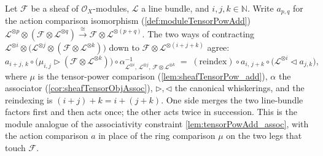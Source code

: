 \begin{lemma}\leanok
  \label{lem:moduleTensorPowAdd_assoc}
  Let \(\mathcal{F}\) be a sheaf of \(\mathcal{O}_X\)-modules, \(\mathcal{L}\) a line
  bundle, and \(i, j, k \in \mathbb{N}\). Write \(a_{p,q}\) for the action comparison
  isomorphism (\cref{def:moduleTensorPowAdd})
  \(\mathcal{L}^{\otimes p}\otimes(\mathcal{F}\otimes\mathcal{L}^{\otimes q})
  \xrightarrow{\cong}\mathcal{F}\otimes\mathcal{L}^{\otimes(p+q)}\). The two ways of
  contracting
  \(\mathcal{L}^{\otimes i}\otimes\bigl(\mathcal{L}^{\otimes j}\otimes
  (\mathcal{F}\otimes\mathcal{L}^{\otimes k})\bigr)\) down to
  \(\mathcal{F}\otimes\mathcal{L}^{\otimes(i+j+k)}\) agree:
  \[
    a_{i+j,\,k}\circ\bigl(\mu_{i,j}\rhd(\mathcal{F}\otimes\mathcal{L}^{\otimes k})\bigr)
      \circ \alpha^{-1}_{\mathcal{L}^{\otimes i},\,\mathcal{L}^{\otimes j},\,
        \mathcal{F}\otimes\mathcal{L}^{\otimes k}}
    \;=\;
    \mathrm{(reindex)}\circ a_{i,\,j+k}\circ
      \bigl(\mathcal{L}^{\otimes i}\lhd a_{j,k}\bigr),
  \]
  where \(\mu\) is the tensor-power comparison (\cref{lem:sheafTensorPow_add}),
  \(\alpha\) the associator (\cref{cor:sheafTensorObjAssoc}), \(\rhd, \lhd\) the
  canonical whiskerings, and the reindexing is \((i+j)+k = i+(j+k)\). One side merges
  the two line-bundle factors first and then acts once; the other acts twice in
  succession. This is the module analogue of the associativity constraint
  \cref{lem:tensorPowAdd_assoc}, with the action comparison \(a\) in place of the
  ring comparison \(\mu\) on the two legs that touch \(\mathcal{F}\).
\end{lemma}

